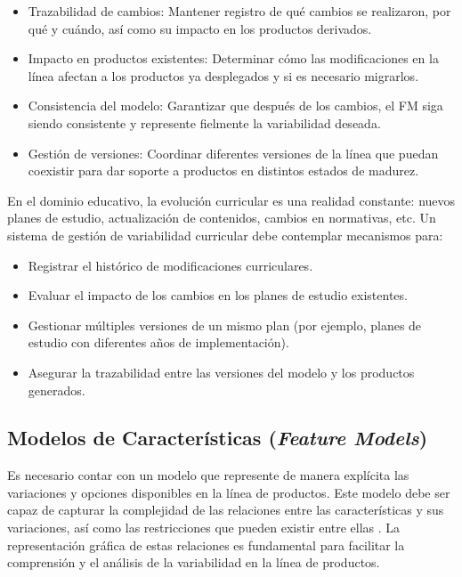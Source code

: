 \begin{itemize}
    \item Trazabilidad de cambios: Mantener registro de qué cambios se realizaron, por qué y cuándo, así como su impacto en los productos derivados.
    
    \item Impacto en productos existentes: Determinar cómo las modificaciones en la línea afectan a los productos ya desplegados y si es necesario migrarlos.
    
    \item Consistencia del modelo: Garantizar que después de los cambios, el \ac{FM} siga siendo consistente y represente fielmente la variabilidad deseada.
    
    \item Gestión de versiones: Coordinar diferentes versiones de la línea que puedan coexistir para dar soporte a productos en distintos estados de madurez.
\end{itemize}

En el dominio educativo, la evolución curricular es una realidad constante: nuevos planes de estudio, actualización de contenidos, cambios en normativas, etc. Un sistema de gestión de variabilidad curricular debe contemplar mecanismos para:

\begin{itemize}
    \item Registrar el histórico de modificaciones curriculares.
    \item Evaluar el impacto de los cambios en los planes de estudio existentes.
    \item Gestionar múltiples versiones de un mismo plan (por ejemplo, planes de estudio con diferentes años de implementación).
    \item Asegurar la trazabilidad entre las versiones del modelo y los productos generados.
\end{itemize}

\subsection{Modelos de Características (\textit{Feature Models})}

Es necesario contar con un modelo que represente de manera explícita las
variaciones y opciones disponibles en la línea de productos. Este modelo
debe ser capaz de capturar la complejidad de las relaciones entre las
características y sus variaciones, así como las restricciones que pueden
existir entre ellas \citep{pohl2005software}. La representación gráfica de 
estas relaciones es fundamental para facilitar la comprensión y el análisis 
de la variabilidad en la línea de productos.

